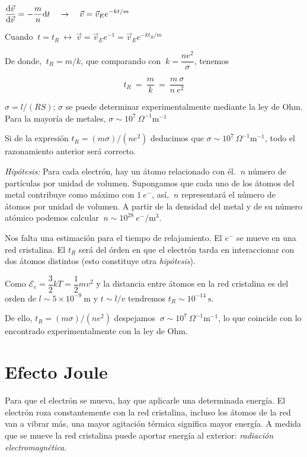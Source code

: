 $\displaystyle \dv{\vec v}{\vec v}=-\dfrac m n \dd t \quad \to \quad \vec v=\vec v_E e^{-kt/m}$

Cuando $\ t=t_R \ \leftrightarrow \ \vec v=\vec v_E e^{-1}=\vec v_E e^{-kt_R/m}$

De donde, $\ t_R=m/k$, que comparando con $\ k=\dfrac{ne^2}{\sigma}$, tenemos

$$t_R \ = \ \dfrac m k \ = \ \dfrac {m\ \sigma}{n\ e^2}$$

$\sigma= l/(RS)$; $\sigma$ se puede determinar experimentalmente mediante la ley de Ohm. Para la mayoría de metales, $\sigma \sim 10^7 \ \Omega^{-1} \mathrm{m}^{-1}$

Si de la expresión $t_R  =  (m\sigma)/(n e^2)$ deducimos que $\sigma \sim 10^7 \ \Omega^{-1} \mathrm{m}^{-1}$, todo el razonamiento anterior será correcto.

\emph{Hipótesis:} Para cada electrón, hay un átomo relacionado con él.  $\ n$ número de partículas por unidad de volumen. Supongamos que cada uno de los átomos del metal contribuye como máximo con $1 \ e^{-}$, así, $\ n$ representará el número de átomos por unidad de volumen. A partir de la densidad del metal y de su número atómico podemos calcular $\ n \sim 10^{28} \ e^-/\mathrm{m}^3$.

Nos falta una estimación para el tiempo de relajamiento. El $e^-$ se mueve en una red cristalina. El $t_R$ será del órden en que el electrón tarda en interaccionar con dos átomos distintos (esto constituye otra \emph{hipótesis}).

Como $\mathcal E_c=\dfrac 3 2 k T = \dfrac 1 2 m v^2$ y la distancia entre átomos en la red cristalina es del orden de $l \sim 5\times 10^{-9}\ \mathrm{m}$ y $t\sim l/v$ tendremos $t_R \sim 10^{-14} \ \mathrm{s}$.

De ello, $t_R  =  (m\sigma)/(n e^2)$ despejamos $\ \sigma \sim 10^7 \ \Omega^{-1} \mathrm{m}^{-1}$, lo que coincide con lo encontrado experimentalmente con la ley de Ohm.

\section{Efecto Joule}

Para que el electrón se mueva, hay que aplicarle una determinada energía.  El electrón roza constantemente con la red cristalina, incluso los átomos de la red van a vibrar más, una mayor agitación térmica significa mayor energía. A medida que se mueve la red cristalina puede aportar energía al exterior: \emph{radiación electromagnética}.

